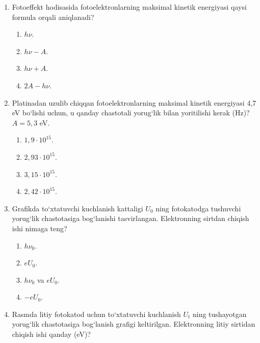 \begin{enumerate}
\item Fotoeffekt hodisasida fotoelektronlarning maksimal kinetik energiyasi qaysi formula orqali aniqlanadi?
\begin{enumerate}[label=\Alph*)]
\item $h\nu$.
\item $h\nu - A$.
\item $h\nu + A$.
\item $2A - h\nu$.
\end{enumerate}

\item Platinadan uzulib chiqqan fotoelektronlarning maksimal kinetik energiyasi 4,7 eV bo‘lishi uchun, u qanday chastotali yorug‘lik bilan yoritilishi kerak (Hz)? $A = 5,3$ eV.
\begin{enumerate}[label=\Alph*)]
\item $1,9\cdot 10^{15}$.
\item $2,93\cdot 10^{15}$.
\item $3,15\cdot 10^{15}$.
\item $2,42\cdot 10^{15}$.
\end{enumerate}

\setcounter{enumi}{11}
\item Grafikda to‘xtatuvchi kuchlanish kattaligi $U_0$ ning fotokatodga tushuvchi yorug‘lik chastotasiga bog‘lanishi tasvirlangan. Elektronning sirtdan chiqish ishi nimaga teng?

\begin{center}
\end{center}

\begin{enumerate}[label=\Alph*)]
\item $h\nu_0$.
\item $eU_0$.
\item $h\nu_0$ va $eU_0$.
\item $-eU_0$.
\end{enumerate}

\item Rasmda litiy fotokatod uchun to‘xtatuvchi kuchlanish $U_t$ ning tushayotgan yorug‘lik chastotasiga bog‘lanish grafigi keltirilgan. Elektronning litiy sirtidan chiqish ishi qanday (eV)?


\end{enumerate}
